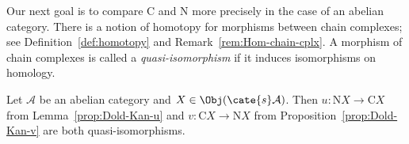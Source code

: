 Our next goal is to compare $\mathrm{C}$ and $\mathrm{N}$ more precisely in
the case of an abelian category. There is a notion of homotopy for morphisms
between chain complexes; see Definition~\ref{def:homotopy} and
Remark~\ref{rem:Hom-chain-cplx}. A morphism of chain complexes is called a
\emph{quasi-isomorphism} if it induces isomorphisms on homology.

\begin{theorem}\label{prop:Dold-Kan-N-C}
	Let $\mathcal{A}$ be an abelian category and
	$X\in\Obj(\cate{s}\mathcal{A})$. Then
	$u:\mathrm{N}X\to\mathrm{C}X$ from Lemma~\ref{prop:Dold-Kan-u} and
	$v:\mathrm{C}X\to\mathrm{N}X$ from Proposition~\ref{prop:Dold-Kan-v}
	are both quasi-isomorphisms.
\end{theorem}
